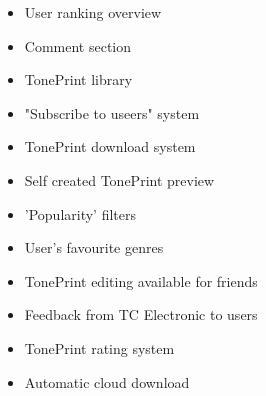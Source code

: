 \begin{itemize}
    \item User ranking overview
    \item Comment section
    \item TonePrint library
    \item "Subscribe to useers" system
    \item TonePrint download system
    \item Self created TonePrint preview
    \item 'Popularity' filters
    \item User's favourite genres
    \item TonePrint editing available for friends
    \item Feedback from TC Electronic to users
    \item  TonePrint rating system 
    \item Automatic cloud download
\end{itemize}